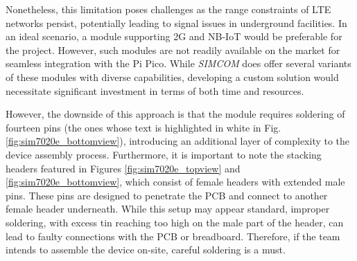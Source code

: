 Nonetheless, this limitation poses challenges as the range constraints of LTE networks persist, potentially leading to 
signal issues in underground facilities. In an ideal scenario, a module supporting 2G and NB-IoT would be preferable for 
the project. However, such modules are not readily available on the market for seamless integration with the Pi Pico. While 
\textit{SIMCOM} does offer several variants of these modules with diverse capabilities, developing a custom solution would 
necessitate significant investment in terms of both time and resources.

However, the downside of this approach is that the module requires soldering of fourteen pins (the ones whose text is 
highlighted in white in Fig. \ref{fig:sim7020e_bottomview}), introducing an additional layer of complexity to the device 
assembly process. Furthermore, it is important to note the stacking headers featured in Figures \ref{fig:sim7020e_topview} 
and \ref{fig:sim7020e_bottomview}, which consist of female headers with extended male pins. These pins are designed to 
penetrate the PCB and connect to another female header underneath. While this setup may appear standard, improper soldering, 
with excess tin reaching too high on the male part of the header, can lead to faulty connections with the PCB or breadboard. 
Therefore, if the team intends to assemble the device on-site, careful soldering is a must.

